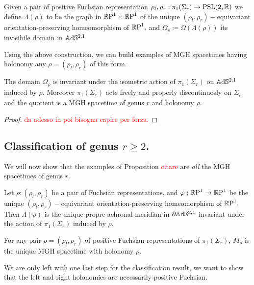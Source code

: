 \begin{definition}
    Given a pair of positive Fuchsian representation $\rho_l,\rho_r:\pi_1(\Sigma_r)\to\text{PSL}(2,\mathbb{R})$ we define $\Lambda(\rho)$ to be the graph in $\mathbb{R}\text{P}^1\times\mathbb{R}\text{P}^1$ of the unique $(\rho_l,\rho_r)-$equivariant orientation-preserving homeomorphism of $\mathbb{R}\text{P}^1,$ and $\Omega_\rho \coloneqq \Omega(\Lambda(\rho))$ its invisibile domain in $\mathbb{A}\mathrm{d}\mathbb{S}^{2,1}$
\end{definition}

Using the above construction, we can build examples of MGH spacetimes having holonomy any $\rho=(\rho_l,\rho_r)$ of this form. 

\begin{proposition}
    The domain $\Omega_\rho$ is invariant under the isometric action of $\pi_1(\Sigma_r)$ on $\mathbb{A}\mathrm{d}\mathbb{S}^{2,1}$ induced by $\rho.$ Moreover $\pi_1(\Sigma_r)$ acts freely and properly discontinuosly on $\Sigma_\rho$ and the quotient is a MGH spacetime of genus $r$ and holonomy $\rho.$ 
\end{proposition}
\begin{proof}
    \textcolor{red}{da adesso in poi bisogna capire per forza.}
\end{proof}

\subsection{Classification of genus $r\geq 2$.} We will now show that the examples of Proposition \textcolor{red}{citare} are \textit{all} the MGH spacetimes of genus $r$. 

\begin{lemma}
    Let $\rho:(\rho_l,\rho_r)$ be a pair of Fuchsian representations, and $\varphi:\mathbb{R}\text{P}^1\to\mathbb{R}\text{P}^1$ be the unique $(\rho_l,\rho_r)-$equivariant orientation-preserving homeomorphism of $\mathbb{R}\text{P}^1.$ Then $\Lambda(\rho)$ is the unique propre achronal meridian in $\partial\mathbb{A}\mathrm{d}\mathbb{S}^{2,1}$ invariant under the action of $\pi_1(\Sigma_r)$ induced by $\rho.$
\end{lemma}

\begin{corollary}
    For any pair $\rho=(\rho_l,\rho_r)$ of positive Fuchsian representations of $\pi_1(\Sigma_r)$, $M_\rho$ is the unique MGH spacetime with holonomy $\rho$.
\end{corollary}

We are only left with one last step for the classification result, we want to show that the left and right holonomies are necessarily positive Fuchsian. 

